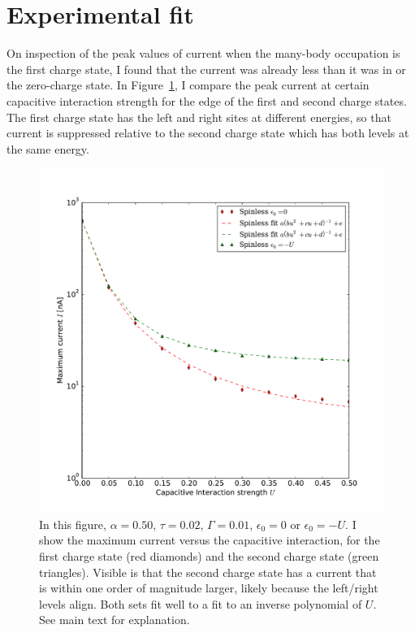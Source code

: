 \section{Experimental fit}
\label{sec:perrin}
On inspection of the peak values of current when the many-body occupation is the first charge state, I found that the current was already less than it was in \citet{perrinnano} or the zero-charge state. In Figure~\ref{fig:imax}, I compare the peak current at certain capacitive interaction strength for the edge of the first and second charge states. The first charge state has the left and right sites at different energies, so that current is suppressed relative to the second charge state which has both levels at the same energy.
\begin{figure}[h]
    \centering
    \includegraphics[height=.38\textheight]{pdf/imax.pdf}
    \caption{In this figure, $\alpha=0.50$, $\tau=0.02$, $\Gamma=0.01$, $\epsilon_0 = 0$ or $\epsilon_0=-U$. I show the maximum current versus the capacitive interaction, for the first charge state (red diamonds) and the second charge state (green triangles). Visible is that the second charge state has a current that is within one order of magnitude larger, likely because the left/right levels align. Both sets fit well to a fit to an inverse polynomial of $U$. See main text for explanation.}
    \label{fig:imax}
\end{figure}

